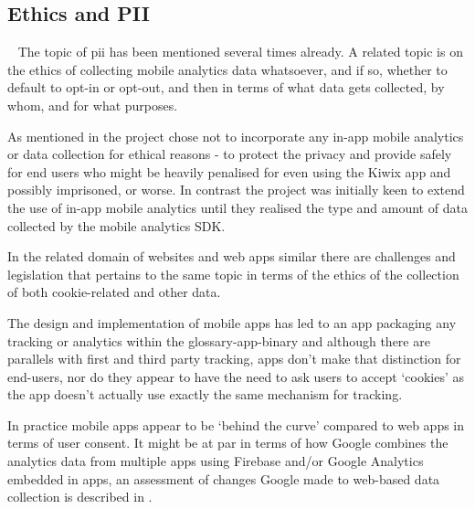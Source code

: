 \subsection{Ethics and PII}~\label{aiu-ethics-and-pii-topics}
The topic of \Gls{pii} has been mentioned several times already. A related topic is on the ethics of collecting mobile analytics data whatsoever, and if so, whether to default to opt-in or opt-out, and then in terms of what data gets collected, by whom, and for what purposes. 

As mentioned in  the  project chose not to incorporate any in-app mobile analytics or data collection for ethical reasons - to protect the privacy and provide safely for end users who might be heavily penalised for even using the Kiwix app and possibly imprisoned, or worse. In contrast the  project was initially keen to extend the use of in-app mobile analytics until they realised the type and amount of data collected by the mobile analytics SDK. 

\begin{kaobox}[frametitle=Comparisons with the `web']
In the related domain of websites and web apps similar there are challenges and legislation that pertains to the same topic in terms of the ethics of the collection of both cookie-related and other data.

The design and implementation of mobile apps has led to an app packaging any tracking or analytics within the \gls{glossary-app-binary} and although there are parallels with first and third party tracking, apps don't make that distinction for end-users, nor do they appear to have the need to ask users to accept `cookies' as the app doesn't actually use exactly the same mechanism for tracking.

In practice mobile apps appear to be `behind the curve' compared to web apps in terms of user consent. It might be at par in terms of how Google combines the analytics data from multiple apps using Firebase and/or Google Analytics embedded in apps, an assessment of changes Google made to web-based data collection is described in .
\end{kaobox}

